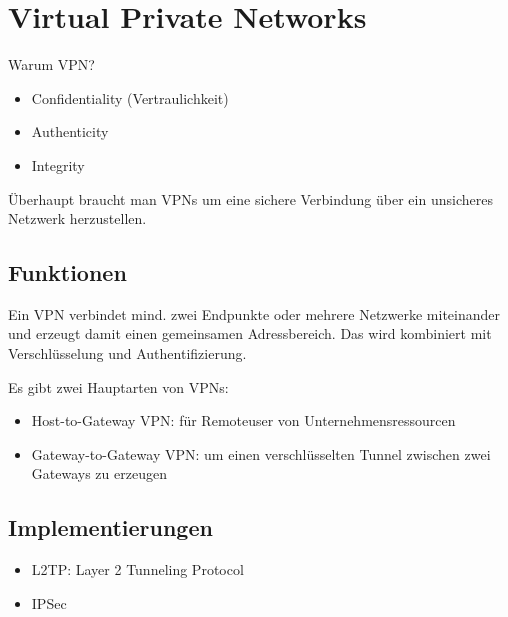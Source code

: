 \section{Virtual Private Networks}%
\label{sec:virtual_private_networks}

Warum VPN?
\begin{itemize}
  \item Confidentiality (Vertraulichkeit)
  \item Authenticity
  \item Integrity
\end{itemize}
Überhaupt braucht man VPNs um eine sichere Verbindung über ein unsicheres Netzwerk
herzustellen.

\subsection{Funktionen}%

Ein VPN verbindet mind. zwei Endpunkte oder mehrere Netzwerke miteinander und erzeugt
damit einen gemeinsamen Adressbereich.
Das wird kombiniert mit Verschlüsselung und Authentifizierung.

Es gibt zwei Hauptarten von VPNs:
\begin{itemize}
  \item Host-to-Gateway VPN: für Remoteuser von Unternehmensressourcen
  \item Gateway-to-Gateway VPN: um einen verschlüsselten Tunnel zwischen zwei Gateways zu
    erzeugen
\end{itemize}

\subsection{Implementierungen}%

\begin{itemize}
  \item L2TP: Layer 2 Tunneling Protocol
  \item IPSec
\end{itemize}
